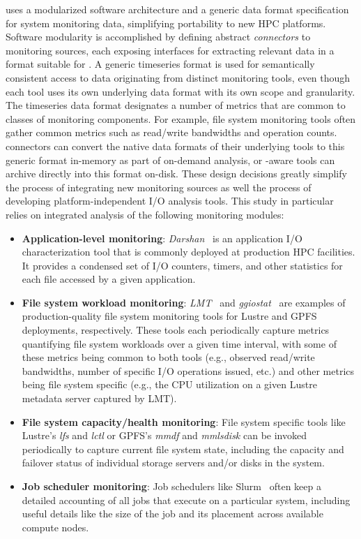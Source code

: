 \tokio uses a modularized software architecture and a generic data format
specification for system monitoring data, simplifying portability to new HPC
platforms. Software modularity is accomplished by defining abstract
\textit{connectors} to monitoring sources, each exposing interfaces for
extracting relevant data in a format suitable for \tokio.  A generic
timeseries format is used for semantically consistent access to data
originating from distinct monitoring tools, even though each tool uses its
own underlying data format with its own scope and granularity.
The timeseries data format designates a number of metrics
that are common to classes of monitoring components.  For example, file system
monitoring tools often gather common metrics such as read/write bandwidths
and operation counts. \tokio connectors can convert the native data formats
of their underlying tools to this generic format in-memory as part of
on-demand analysis, or \tokio-aware tools can archive directly into this
format on-disk. These design decisions greatly simplify the process of
integrating new monitoring sources as well the process of developing
platform-independent I/O analysis tools.  This study in particular relies on
integrated analysis of the following monitoring modules:

\begin{itemize}[leftmargin=*]
\item \textbf{Application-level monitoring}: \textit{Darshan}~\cite{Carns2009} is an application I/O characterization tool that is commonly deployed at production HPC facilities. It provides a condensed set of I/O counters, timers, and other statistics for each file accessed by a given application.

\item \textbf{File system workload monitoring}: \textit{LMT}~\cite{lmt} and \textit{ggiostat}~\cite{Lockwood2017} are examples of 
production-quality file system monitoring tools for Lustre and GPFS deployments, respectively. These tools each periodically capture metrics quantifying file system workloads over a given time interval, with some of these metrics being common to both tools (e.g., observed read/write bandwidths, number of specific I/O operations issued, etc.) and other metrics being file system specific (e.g., the CPU utilization on a given Lustre metadata server captured by LMT).

\item \textbf{File system capacity/health monitoring}: File system specific tools like Lustre's \textit{lfs} and \textit{lctl} or GPFS's \textit{mmdf} and \textit{mmlsdisk} can be invoked periodically to capture current file system state, including the capacity and failover status of individual storage servers and/or disks in the system.

\item \textbf{Job scheduler monitoring}: Job schedulers like Slurm~\cite{2003slurm} often keep a detailed accounting of all jobs that execute on a particular system, including useful details like the size of the job and its placement across available compute nodes.
\end{itemize}

